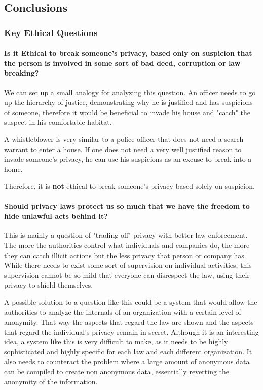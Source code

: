     
\subsection{Conclusions}
    \subsubsection{Key Ethical Questions}

    \paragraph{Is it Ethical to break someone's privacy, based only on suspicion that the person is involved in some sort of bad deed, corruption or law breaking?}
    We can set up a small analogy for analyzing this question.
    An officer needs to go up the hierarchy of justice, demonstrating why he is justified and has suspicions of someone, therefore it would be beneficial to invade his house and "catch" the suspect in his comfortable habitat.
    
    A whistleblower is very similar to a police officer that does not need a search warrant to enter a house.
    If one does not need a very well justified reason to invade someone's privacy, he can use his suspicions as an excuse to break into a home.
    
    Therefore, it is \textbf{not} ethical to break someone's privacy based solely on suspicion.

    \paragraph{Should privacy laws protect us so much that we have the freedom to hide unlawful acts behind it?}
    This is mainly a question of "trading-off" privacy with better law enforcement.
    The more the authorities control what individuals and companies do, the more they can catch illicit actions but the less privacy that person or company has.
    While there needs to exist some sort of supervision on individual activities, this supervision cannot be so mild that everyone can disrespect the law, using their privacy to shield themselves.

    A possible solution to a question like this could be a system that would allow the authorities to analyze the internals of an organization with a certain level of anonymity.
    That way the aspects that regard the law are shown and the aspects that regard the individual's privacy remain in secret.
    Although it is an interesting idea, a system like this is very difficult to make, as it needs to be highly sophisticated and highly specific for each law and each different organization.
    It also needs to counteract the problem where a large amount of anonymous data can be compiled to create non anonymous data, essentially reverting the anonymity of the information.
    

